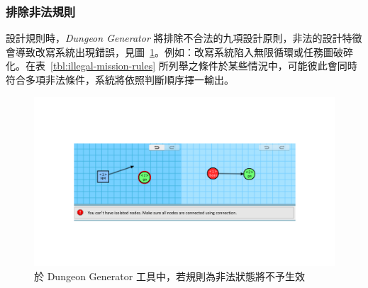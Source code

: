 

\subsubsection{排除非法規則}
\label{sssec:method-missiongrammars-rules-illegals}

設計規則時，\textit{Dungeon Generator} 將排除不合法的九項設計原則，非法的設計特徵會導致改寫系統出現錯誤，見圖~\ref{fig:missiongrammars-illegal-rules}。例如：改寫系統陷入無限循環或任務圖破碎化。在表~\ref{tbl:illegal-mission-rules} 所列舉之條件於某些情況中，可能彼此會同時符合多項非法條件，系統將依照判斷順序擇一輸出。

\begin{figure}[!htb]
  \begin{center}
    \includegraphics[width=1.0\textwidth]{figures/missiongrammars-illegal-rules.pdf}
    \caption{於 Dungeon Generator 工具中，若規則為非法狀態將不予生效}
    \label{fig:missiongrammars-illegal-rules}
  \end{center}
\end{figure}

